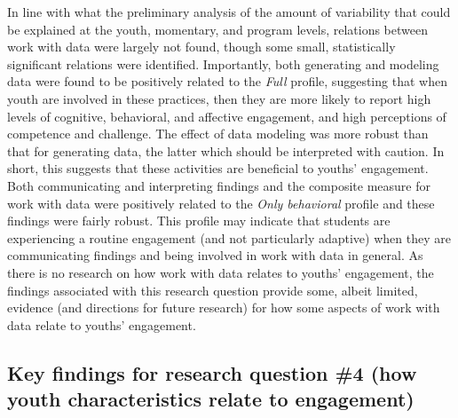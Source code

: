 \documentclass[]{msu-thesis}
\theoremstyle{definition}
\theoremstyle{definition}
\theoremstyle{definition}
\theoremstyle{remark}
\begin{document}
In line with what the preliminary analysis of the amount of variability
that could be explained at the youth, momentary, and program levels,
relations between work with data were largely not found, though some
small, statistically significant relations were identified. Importantly,
both generating and modeling data were found to be positively related to
the \emph{Full} profile, suggesting that when youth are involved in
these practices, then they are more likely to report high levels of
cognitive, behavioral, and affective engagement, and high perceptions of
competence and challenge. The effect of data modeling was more robust
than that for generating data, the latter which should be interpreted
with caution. In short, this suggests that these activities are
beneficial to youths' engagement. Both communicating and interpreting
findings and the composite measure for work with data were positively
related to the \emph{Only behavioral} profile and these findings were
fairly robust. This profile may indicate that students are experiencing
a routine engagement (and not particularly adaptive) when they are
communicating findings and being involved in work with data in general.
As there is no research on how work with data relates to youths'
engagement, the findings associated with this research question provide
some, albeit limited, evidence (and directions for future research) for
how some aspects of work with data relate to youths' engagement.

\subsection{Key findings for research question \#4 (how youth
characteristics relate to
engagement)}\label{key-findings-for-research-question-4-how-youth-characteristics-relate-to-engagement}
\end{document}
